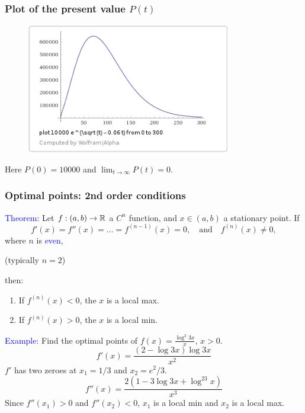 \documentclass[11pt,aspectratio=169]{beamer}
\begin{document}
\begin{frame}
\frametitle{Plot of the present value $P(t)$}


\begin{figure}
\includegraphics[width=3.5in]{img/plot} 
\end{figure}

Here $P(0)=10000$ and $\lim_{t \rightarrow \infty} P(t)=0$.%
\end{frame}

\begin{frame}
\frametitle{Optimal points: 2nd order conditions}
\textcolor{blue}{Theorem:} Let $f:(a,b) \rightarrow \mathbb R$ a $C^n$ function, and $x \in (a,b)$ a stationary point. If
$$
f'(x)=f''(x)=\dots=f^{(n-1)}(x)=0, \quad \text{and} \quad f^{(n)}(x) \neq 0,
$$
where $n$ is \textcolor{blue}{even}, \begin{tiny} (typically $n=2$)\end{tiny} then:
\begin{enumerate}
\item If $f^{(n)}(x)<0$, the $x$ is a local max.
\item If $f^{(n)}(x)>0$, the $x$ is a local min.
\end{enumerate}

\textcolor{blue}{Example:} Find the optimal points of $f(x)=\frac{\log^2 3x}{x}$, $x>0$.
$$
f'(x)=\frac{(2-\log 3x)\log 3x}{x^2}
$$
$f'$ has two zeroes at $x_1=1/3$ and $x_2=e^2/3$.
$$
f''(x)=\frac{2(1-3\log3x+\log^23x)}{x^3}
$$
Since $f''(x_1)>0$ and $f''(x_2)<0$, $x_1$ is a local min and $x_2$ is a local max.
\end{frame}
\end{document}
